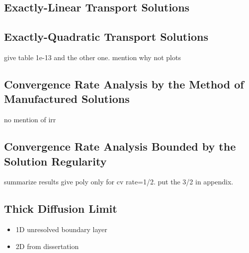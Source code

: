 \documentclass[preprint,10pt]{elsarticle}
\begin{document}
\subsection{Exactly-Linear Transport Solutions}

\subsection{Exactly-Quadratic Transport Solutions}
give table 1e-13 and the other one. mention why not plots

\subsection{Convergence Rate Analysis by the Method of Manufactured Solutions}
no mention of irr

\subsection{Convergence Rate Analysis Bounded by the Solution Regularity}
summarize results 
give poly only for cv rate=1/2. put the 3/2 in appendix.

\subsection{Thick Diffusion Limit}
\begin{itemize}
\item 1D unresolved boundary layer
\item 2D from dissertation
\end{itemize}
\end{document}

